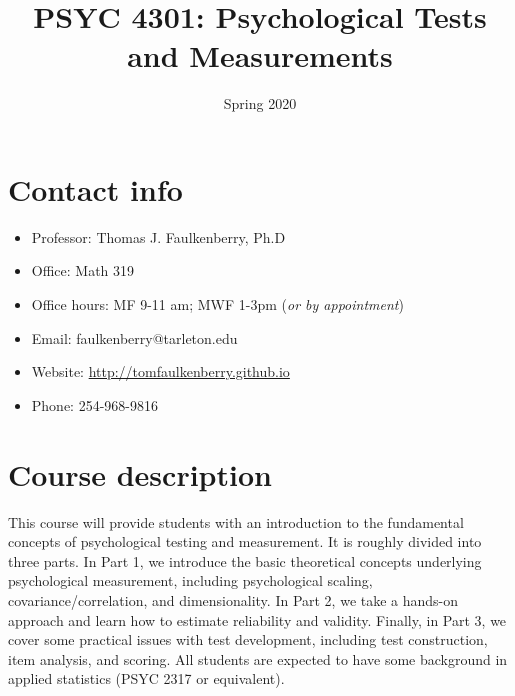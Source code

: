 \documentclass[10pt]{article}
\date{Spring 2020}
\title{PSYC 4301: Psychological Tests and Measurements}
\begin{document}
\maketitle

\section*{Contact info}
\label{sec:org4600bc5}
\begin{itemize}
\item Professor: Thomas J. Faulkenberry, Ph.D
\item Office: Math 319
\item Office hours: MF 9-11 am; MWF 1-3pm (\emph{or by appointment})
\item Email: faulkenberry@tarleton.edu
\item Website: \url{http://tomfaulkenberry.github.io}
\item Phone: 254-968-9816
\end{itemize}

\section*{Course description}
\label{sec:org641c5f7}

This course will provide students with an introduction to the fundamental concepts of psychological testing and measurement. It is roughly divided into three parts. In Part 1, we introduce the basic theoretical concepts underlying psychological measurement, including psychological scaling, covariance/correlation, and dimensionality. In Part 2, we take a hands-on approach and learn how to estimate reliability and validity. Finally, in Part 3, we cover some practical issues with test development, including test construction, item analysis, and scoring. All students are expected to have some background in applied statistics (PSYC 2317 or equivalent). 
\end{document}
